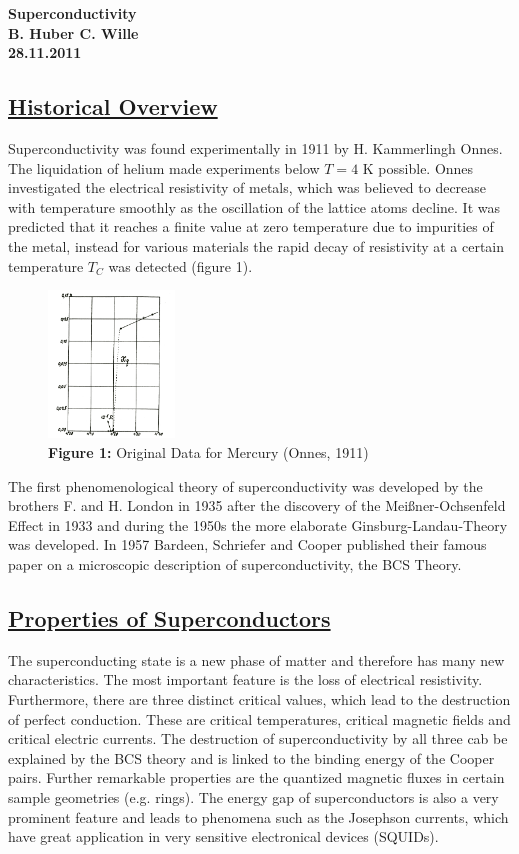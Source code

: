 \documentclass[a4paper]{scrartcl}
\numberwithin{equation}{section}
\numberwithin{figure}{section}
\numberwithin{table}{section}
\newcommand{\ssubsection}[1]{{ \subsection*{\linebreak \centering\bf\underline {#1}}}}
\begin{document}
\begin{center}
\Huge \bf \sc Superconductivity \\
\large B. Huber \quad C. Wille \\
\small 28.11.2011
\end{center}
\small
\ssubsection{Historical Overview}
Superconductivity was found experimentally in 1911 by H. Kammerlingh Onnes. The liquidation of helium made experiments below $T=4$ K possible. Onnes investigated the electrical resistivity of metals, which was believed to decrease with temperature smoothly as the oscillation of the lattice atoms decline. It was predicted that it reaches a finite value at zero temperature due to impurities of the metal, instead for various materials the rapid decay of resistivity at a certain temperature $T_C$ was detected (figure 1). 

\begin{figure}
\includegraphics[width=0.3\textwidth]{img/heikemess.png}
\caption*{\textbf{Figure 1: }\small Original Data for Mercury (Onnes, 1911) \cite{onnes}}
\label{fig:onnes}
\end{figure}

The first phenomenological theory of superconductivity was developed by the brothers F. and H. London in 1935 after the discovery of the Meißner-Ochsenfeld Effect in 1933 and during the 1950s the more elaborate Ginsburg-Landau-Theory was developed. In 1957 Bardeen, Schriefer and Cooper published their famous paper on a microscopic description of superconductivity, the BCS Theory.

\ssubsection{Properties of Superconductors}
The superconducting state is a new phase of matter and therefore has many new characteristics. The most important feature is the loss of electrical resistivity. Furthermore, there are three distinct critical values, which lead to the destruction of perfect conduction. These are critical temperatures, critical magnetic fields and critical electric currents. The destruction of superconductivity by all three cab be explained by the BCS theory and is linked to the binding energy of the Cooper pairs. Further remarkable properties are the quantized magnetic fluxes in certain sample geometries (e.g. rings). The energy gap of superconductors is also a very prominent feature and leads to phenomena such as the Josephson currents, which have great application in very sensitive electronical devices (SQUIDs). 
\end{document}

